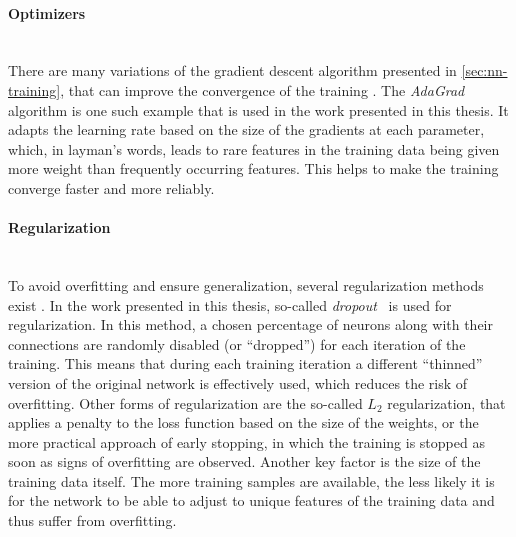 \paragraph{Optimizers}\mbox{}\\
There are many variations of the gradient descent algorithm presented in \cref{sec:nn-training}, that can improve the convergence of the training . The \emph{AdaGrad}~ algorithm is one such example that is used in the work presented in this thesis. It adapts the learning rate based on the size of the gradients at each parameter, which, in layman's words, leads to rare features in the training data being given more weight than frequently occurring features. This helps to make the training converge faster and more reliably.

\paragraph{Regularization}\mbox{}\\
To avoid overfitting and ensure generalization, several regularization methods exist . 
In the work presented in this thesis, so-called \emph{dropout}~ is used for regularization. In this method, a chosen percentage of neurons along with their connections are randomly disabled (or ``dropped'') for each iteration of the training. This means that during each training iteration a different ``thinned'' version of the original network is effectively used, which reduces the risk of overfitting. 
Other forms of regularization are the so-called $L_2$ regularization, that applies a penalty to the loss function based on the size of the weights, or the more practical approach of early stopping, in which the training is stopped as soon as signs of overfitting are observed. 
Another key factor is the size of the training data itself. The more training samples are available, the less likely it is for the network to be able to adjust to unique features of the training data and thus suffer from overfitting.



